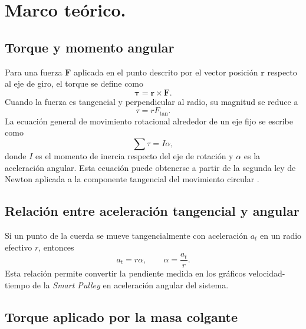 \documentclass[11pt,twocolumn]{article}
\makeatletter
\let\orig@parencite\parencite
\renewcommand{\parencite}[1]{\textcolor{Blue}{\orig@parencite{#1}}}
\renewcommand{\cite}[1]{\parencite{#1}}
\newcommand{\vect}[1]{\boldsymbol{#1}}
\makeatother
\begin{document}
\section{Marco teórico.}

\subsection{Torque y momento angular}

Para una fuerza $\vect{F}$ aplicada en el punto descrito por el vector posición $\vect{r}$ respecto al eje de giro, el torque se define como
\begin{equation*}
    \vect{\tau}=\vect{r}\times\vect{F}.
\end{equation*}
Cuando la fuerza es tangencial y perpendicular al radio, su magnitud se reduce a
\begin{equation*}
    \tau=rF_{\mathrm{tan}}.
\end{equation*}
La ecuación general de movimiento rotacional alrededor de un eje fijo se escribe como
\begin{equation*}
    \sum \tau = I\alpha,
\end{equation*}
donde $I$ es el momento de inercia respecto del eje de rotación y $\alpha$ es la aceleración angular. Esta ecuación puede obtenerse a partir de la segunda ley de Newton aplicada a la componente tangencial del movimiento circular \cite{serway2013,halliday2014}.

\subsection{Relación entre aceleración tangencial y angular}

Si un punto de la cuerda se mueve tangencialmente con aceleración $a_t$ en un radio efectivo $r$, entonces
\begin{equation*}
    a_t=r\alpha,
    \qquad
    \alpha=\frac{a_t}{r}.
\end{equation*}
Esta relación permite convertir la pendiente medida en los gráficos velocidad-tiempo de la \textit{Smart Pulley} en aceleración angular del sistema.

\subsection{Torque aplicado por la masa colgante}
\end{document}
